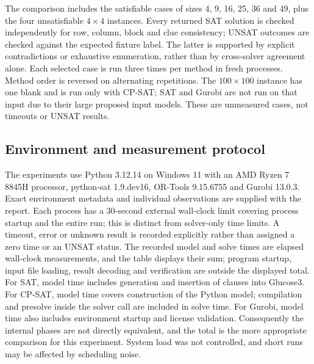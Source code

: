 \documentclass[a4paper,fleqn]{cas-sc}
\begin{document}
The comparison includes the satisfiable cases of sizes 4, 9, 16, 25, 36 and 49, plus the four unsatisfiable \(4\times4\) instances. Every returned SAT solution is checked independently for row, column, block and clue consistency; UNSAT outcomes are checked against the expected fixture label. The latter is supported by explicit contradictions or exhaustive enumeration, rather than by cross-solver agreement alone. Each selected case is run three times per method in fresh processes. Method order is reversed on alternating repetitions. The \(100\times100\) instance has one blank and is run only with CP-SAT; SAT and Gurobi are not run on that input due to their large proposed input models. These are unmeasured cases, not timeouts or UNSAT results.

\subsection{Environment and measurement protocol}
The experiments use Python 3.12.14 on Windows 11 with an AMD Ryzen 7 8845H processor, python-sat 1.9.dev16, OR-Tools 9.15.6755 and Gurobi 13.0.3. Exact environment metadata and individual observations are supplied with the report. Each process has a 30-second external wall-clock limit covering process startup and the entire run; this is distinct from solver-only time limits. A timeout, error or unknown result is recorded explicitly rather than assigned a zero time or an UNSAT status. The recorded model and solve times are elapsed wall-clock measurements, and the table displays their sum; program startup, input file loading, result decoding and verification are outside the displayed total. For SAT, model time includes generation and insertion of clauses into Glucose3. For CP-SAT, model time covers construction of the Python model; compilation and presolve inside the solver call are included in solve time. For Gurobi, model time also includes environment startup and license validation. Consequently the internal phases are not directly equivalent, and the total is the more appropriate comparison for this experiment. System load was not controlled, and short runs may be affected by scheduling noise.
\end{document}
